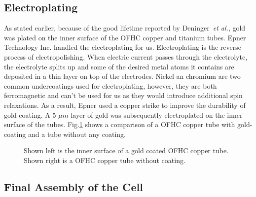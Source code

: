 \subsection{Electroplating}

As stated earlier, because of the good lifetime reported by Deninger~\emph{et al.}, gold was plated on the inner surface of the OFHC copper and titanium tubes. Epner Technology Inc. handled the electroplating for us. Electroplating is the reverse process of electropolishing. When electric current passes through the electrolyte, the electrolyte splits up and some of the desired metal atoms it contains are deposited in a thin layer on top of the electrodes. Nickel an chromium are two common undercoatings used for electroplating, however, they are both ferromagnetic and can't be used for us as they would introduce additional spin relaxations. As a result, Epner used a copper strike to improve the durability of gold coating. A 5 $\mu m$ layer of gold was subsequently electroplated on the inner surface of the tubes. Fig.\ref{gold_coating} shows a comparison of a OFHC copper tube with gold-coating and a tube without any coating. 

\begin{figure}[t!]
	\centering
	\caption{{Shown left is the inner surface of a gold coated OFHC copper tube. Shown right is a OFHC copper tube without coating.}}
	\label{gold_coating}
\end{figure}

\subsection{Final Assembly of the Cell}

